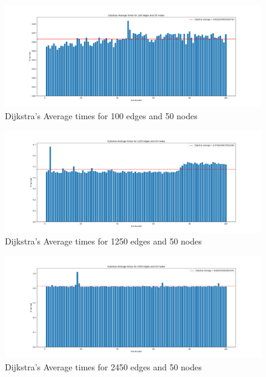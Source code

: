 \documentclass[12pt]{article}
\begin{document}
\begin{figure}[H]
    \centering
    \includegraphics[width=\textwidth]{images/Dijkstras Average times for 100 edges and 50 nodes.png}
    \caption{Dijkstra's Average times for 100 edges and 50 nodes}
\end{figure}

\begin{figure}[H]
    \centering
    \includegraphics[width=\textwidth]{images/Dijkstras Average times for 1250 edges and 50 nodes.png}
    \caption{Dijkstra's Average times for 1250 edges and 50 nodes}
\end{figure}

\begin{figure}[H]
    \centering
    \includegraphics[width=\textwidth]{images/Dijkstras Average times for 2450 edges and 50 nodes.png}
    \caption{Dijkstra's Average times for 2450 edges and 50 nodes}
\end{figure}
\end{document}

